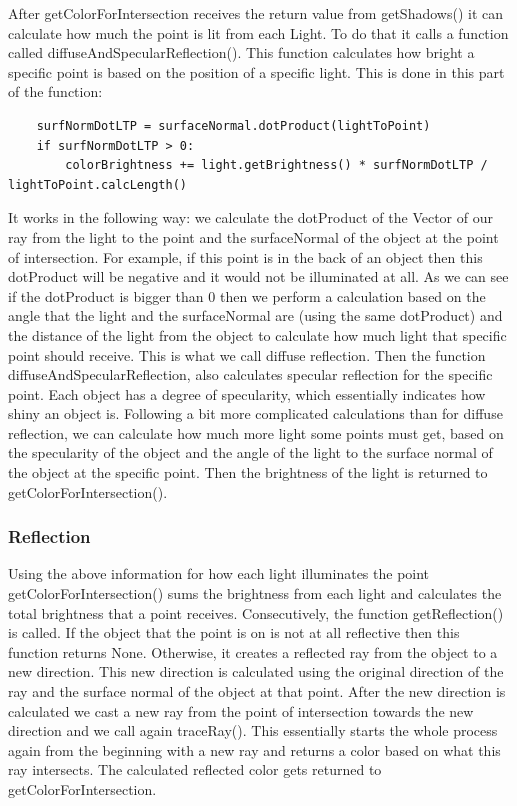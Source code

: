 \documentclass[10pt]{scrartcl}
\begin{document}
After getColorForIntersection receives the return value from getShadows() it can calculate how much the point is lit from each Light. To do that it calls a function called diffuseAndSpecularReflection(). This function calculates how bright a specific point is based on the position of a specific light. This is done in this part of the function:

\begin{lstlisting}
    surfNormDotLTP = surfaceNormal.dotProduct(lightToPoint)
    if surfNormDotLTP > 0:
        colorBrightness += light.getBrightness() * surfNormDotLTP / lightToPoint.calcLength()
\end{lstlisting}

It works in the following way: we calculate the dotProduct of the Vector of our ray from the light to the point and the surfaceNormal of the object at the point of intersection. For example, if this point is in the back of an object then this dotProduct will be negative and it would not be illuminated at all. As we can see if the dotProduct is bigger than 0 then we perform a calculation based on the angle that the light and the surfaceNormal are (using the same dotProduct) and the distance of the light from the object to calculate how much light that specific point should receive. This is what we call diffuse reflection. Then the function diffuseAndSpecularReflection, also calculates specular reflection for the specific point. Each object has a degree of specularity, which essentially indicates how shiny an object is. Following a bit more complicated calculations than for diffuse reflection, we can calculate how much more light some points must get, based on the specularity of the object and the angle of the light to the surface normal of the object at the specific point. Then the brightness of the light is returned to getColorForIntersection().

\par 

\subsubsection{ Reflection }

Using the above information for how each light illuminates the point getColorForIntersection() sums the brightness from each light and calculates the total brightness that a point receives. Consecutively, the function getReflection() is called. If the object that the point is on is not at all reflective then this function returns None. Otherwise, it creates a reflected ray from the object to a new direction. This new direction is calculated using the original direction of the ray and the surface normal of the object at that point. After the new direction is calculated we cast a new ray from the point of intersection towards the new direction and we call again traceRay(). This essentially starts the whole process again from the beginning with a new ray and returns a color based on what this ray intersects. The calculated reflected color gets returned to getColorForIntersection.
\par
\end{document}
